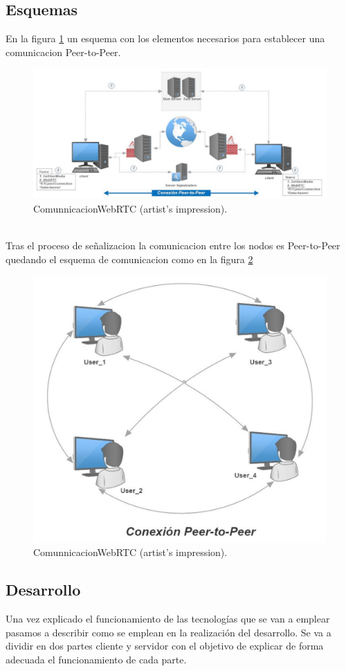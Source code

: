 \subsection{Esquemas}
En la figura \ref{fig:ComunnicacionWebRTC} un esquema con los elementos necesarios para establecer una comunicacion Peer-to-Peer.
\begin{figure}[!h]
\centering
\includegraphics[width=0.6\linewidth]{Figures/ComunnicacionWebRTC}
\decoRule
\caption[An Electron]{ComunnicacionWebRTC (artist's impression).}
\label{fig:ComunnicacionWebRTC}
\end{figure}
\\Tras el proceso de señalizacion la comunicacion entre los nodos es Peer-to-Peer quedando el esquema de comunicacion como en la figura \ref{fig:Conexcion_finish}
\begin{figure}[!h]
\centering
\includegraphics[width=0.6\linewidth]{Figures/Conexcion_finish}
\decoRule
\caption[An Electron]{ComunnicacionWebRTC (artist's impression).}
\label{fig:Conexcion_finish}
\end{figure}
\subsection{Desarrollo}
Una vez explicado el funcionamiento de las tecnologías  que se van a emplear pasamos a describir como se emplean en la realización del desarrollo.
Se va a dividir en dos partes cliente y servidor con el objetivo de explicar de forma adecuada el funcionamiento de cada parte.
